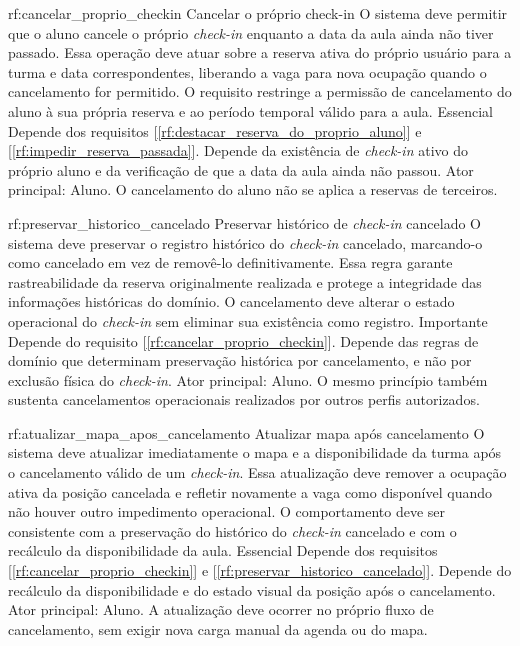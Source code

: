 \reqfuncfull
{rf:cancelar_proprio_checkin}
{Cancelar o próprio check-in}
{O sistema deve permitir que o aluno cancele o próprio \textit{check-in} enquanto a data da aula ainda não tiver passado. Essa operação deve atuar sobre a reserva ativa do próprio usuário para a turma e data correspondentes, liberando a vaga para nova ocupação quando o cancelamento for permitido. O requisito restringe a permissão de cancelamento do aluno à sua própria reserva e ao período temporal válido para a aula.}
{Essencial}
{Depende dos requisitos [\ref{rf:destacar_reserva_do_proprio_aluno}] e [\ref{rf:impedir_reserva_passada}]. Depende da existência de \textit{check-in} ativo do próprio aluno e da verificação de que a data da aula ainda não passou.}
{Ator principal: Aluno. O cancelamento do aluno não se aplica a reservas de terceiros.}

\reqfuncfull
{rf:preservar_historico_cancelado}
{Preservar histórico de \textit{check-in} cancelado}
{O sistema deve preservar o registro histórico do \textit{check-in} cancelado, marcando-o como cancelado em vez de removê-lo definitivamente. Essa regra garante rastreabilidade da reserva originalmente realizada e protege a integridade das informações históricas do domínio. O cancelamento deve alterar o estado operacional do \textit{check-in} sem eliminar sua existência como registro.}
{Importante}
{Depende do requisito [\ref{rf:cancelar_proprio_checkin}]. Depende das regras de domínio que determinam preservação histórica por cancelamento, e não por exclusão física do \textit{check-in}.}
{Ator principal: Aluno. O mesmo princípio também sustenta cancelamentos operacionais realizados por outros perfis autorizados.}

\reqfuncfull
{rf:atualizar_mapa_apos_cancelamento}
{Atualizar mapa após cancelamento}
{O sistema deve atualizar imediatamente o mapa e a disponibilidade da turma após o cancelamento válido de um \textit{check-in}. Essa atualização deve remover a ocupação ativa da posição cancelada e refletir novamente a vaga como disponível quando não houver outro impedimento operacional. O comportamento deve ser consistente com a preservação do histórico do \textit{check-in} cancelado e com o recálculo da disponibilidade da aula.}
{Essencial}
{Depende dos requisitos [\ref{rf:cancelar_proprio_checkin}] e [\ref{rf:preservar_historico_cancelado}]. Depende do recálculo da disponibilidade e do estado visual da posição após o cancelamento.}
{Ator principal: Aluno. A atualização deve ocorrer no próprio fluxo de cancelamento, sem exigir nova carga manual da agenda ou do mapa.}

